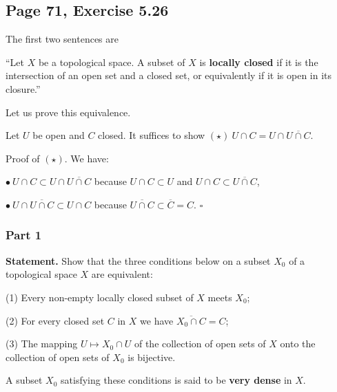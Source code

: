 \documentclass[parskip=half,fontsize=12pt]{scrartcl}%
\begin{document}
\subsection{Page 71, Exercise 5.26}%

The first two sentences are

``Let $X$ be a topological space. A subset of $X$ is \textbf{locally closed} if it is the intersection of an open set and a closed set, or equivalently if it is open in its closure.'' 

Let us prove this equivalence.

Let $U$ be open and $C$ closed. It suffices to show $(\star)\ U\cap C=U\cap\overline{U\cap C}$. 

Proof of $(\star)$. We have:

$\bullet\ U\cap C\subset U\cap\overline{U\cap C}$ because $U\cap C\subset U$ and $U\cap C\subset\overline{U\cap C}$,

$\bullet\ U\cap\overline{U\cap C}\subset U\cap C$ because $\overline{U\cap C}\subset\overline C=C$. $\square$ %

\subsubsection{Part 1}

\textbf{Statement.} Show that the three conditions below on a subset $X_0$ of a topological space $X$ are equivalent:

(1) Every non-empty locally closed subset of $X$ meets $X_0$;

(2) For every closed set $C$ in $X$ we have $\overline{X_0\cap C}=C$;

(3) The mapping $U\mapsto X_0\cap U$ of the collection of open sets of $X$ onto the collection of open sets of $X_0$ is bijective.

A subset $X_0$ satisfying these conditions is said to be \textbf{very dense} in $X$. 
\end{document}
